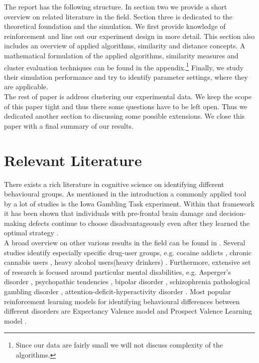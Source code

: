 \documentclass[12pt,a4paper,bibliography=totocnumbered,listof=totocnumbered]{scrartcl}
\begin{document}
The report has the following structure. In section two we provide a short overview on related literature in the field. Section three is dedicated to the theoretical foundation and the simulation. We first provide knowledge of reinforcement and line out our experiment design in more detail. This section also includes an overview of applied algorithms, similarity and distance concepts. A mathematical formulation of the applied algorithms, similarity measures and cluster evaluation techniques can be found in the appendix.\footnote{Since our data are fairly small we will not discuss complexity of the algorithms.} Finally, we study their simulation performance and try to identify parameter settings, where they are applicable.\\ 
The rest of paper is address clustering our experimental data. We keep the scope of this paper tight and thus there some questions have to be left open. Thus we dedicated another section to discussing some possible extensions. We close this paper with a final summary of our results.


\section{Relevant Literature}

There exists a rich literature in cognitive science on identifying different behavioural groups. As mentioned in the introduction a commonly applied tool by a lot of studies is the Iowa Gambling Task experiment. Within that framework it has been shown that individuals with pre-frontal brain damage and decision-making defects continue to choose disadvantageously even after they learned the optimal strategy \cite{Bechara1997}.\\
A broad overview on other various results in the field can be found in \cite{Steingroever2013}. Several studies identify especially specific drug-user groups, e.g. cocaine addicts \cite{Stout2004}, chronic cannabis users \cite{Fridberg2010}, heavy alcohol users(heavy drinkers) \cite{Gullo2011}. Furthermore, extensive set of research is focused around particular mental disabilities, e.g. Asperger's disorder \cite{Johnson2006}, psychopathic tendencies \cite{Blair2001}, bipolar disorder \cite{Brambilla2012}, schizophrenia \cite{Martino2007} pathological gambling disorder \cite{Cavedini2002}, attention-deficit-hyperactivity disorder \cite{NiritAgay2010}. Most popular reinforcement learning models for identifying behavioural differences between different disorders are Expectancy Valence model \cite{Busemeyer2002} and Prospect Valence Learning model \cite{Ahn2008}.
\end{document}
